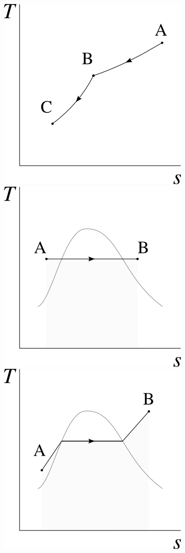\begin{description}
{						\includegraphics[width=\solutiondiagramwidth]{images/exo_sol_ts_multiples2.png}
						\includegraphics[width=\solutiondiagramwidth]{images/exo_sol_ts_multiples3.png}
						\includegraphics[width=\solutiondiagramwidth]{images/exo_sol_ts_multiples4.png}
}
\end{description}
